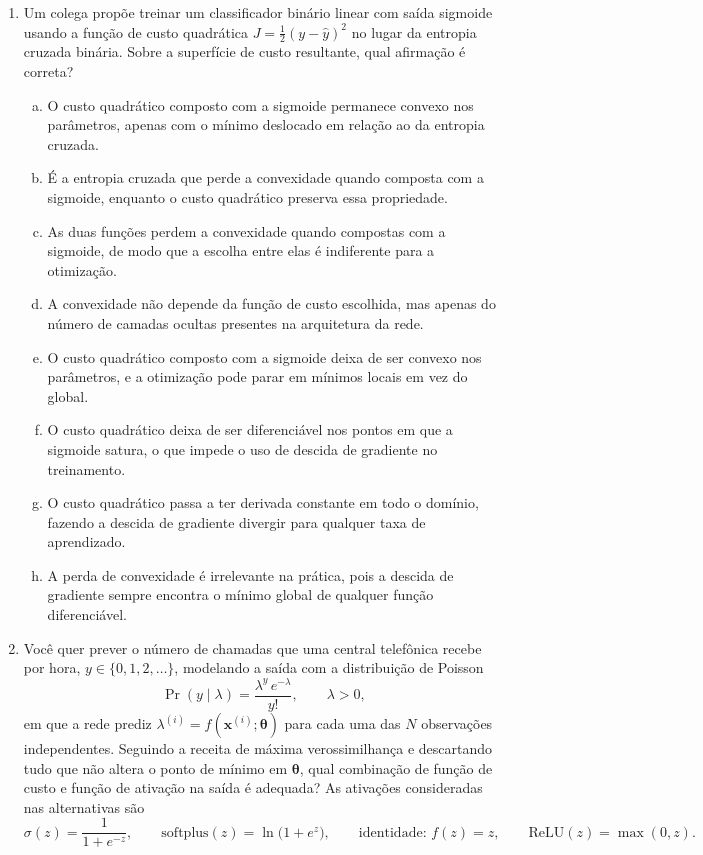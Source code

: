 \documentclass{dlproblemset}
\begin{document}
\begin{enumerate}[1)]
    \item Um colega propõe treinar um classificador binário linear com saída sigmoide usando a função de custo quadrática $J = \tfrac{1}{2}(y - \hat{y})^2$ no lugar da entropia cruzada binária. Sobre a superfície de custo resultante, qual afirmação é correta?
    \begin{enumerate}[(a)]
        \item O custo quadrático composto com a sigmoide permanece convexo nos parâmetros, apenas com o mínimo deslocado em relação ao da entropia cruzada.
        \item É a entropia cruzada que perde a convexidade quando composta com a sigmoide, enquanto o custo quadrático preserva essa propriedade.
        \item As duas funções perdem a convexidade quando compostas com a sigmoide, de modo que a escolha entre elas é indiferente para a otimização.
        \item A convexidade não depende da função de custo escolhida, mas apenas do número de camadas ocultas presentes na arquitetura da rede.
        \item O custo quadrático composto com a sigmoide deixa de ser convexo nos parâmetros, e a otimização pode parar em mínimos locais em vez do global.
        \item O custo quadrático deixa de ser diferenciável nos pontos em que a sigmoide satura, o que impede o uso de descida de gradiente no treinamento.
        \item O custo quadrático passa a ter derivada constante em todo o domínio, fazendo a descida de gradiente divergir para qualquer taxa de aprendizado.
        \item A perda de convexidade é irrelevante na prática, pois a descida de gradiente sempre encontra o mínimo global de qualquer função diferenciável.
    \end{enumerate}

    \item Você quer prever o número de chamadas que uma central telefônica recebe por hora, $y \in \{0, 1, 2, \ldots\}$, modelando a saída com a distribuição de Poisson
    \[
    \Pr(y \mid \lambda) = \frac{\lambda^{y}\,e^{-\lambda}}{y!}, \qquad \lambda > 0 ,
    \]
    em que a rede prediz $\lambda^{(i)} = f(\mathbf{x}^{(i)}; \boldsymbol{\theta})$ para cada uma das $N$ observações independentes. Seguindo a receita de máxima verossimilhança e descartando tudo que não altera o ponto de mínimo em $\boldsymbol{\theta}$, qual combinação de função de custo e função de ativação na saída é adequada? As ativações consideradas nas alternativas são
    \[
    \sigma(z) = \frac{1}{1 + e^{-z}}, \qquad
    \mathrm{softplus}(z) = \ln\bigl(1 + e^{z}\bigr), \qquad
    \text{identidade: } f(z) = z, \qquad
    \mathrm{ReLU}(z) = \max(0, z).
    \]


\end{enumerate}
\end{document}
